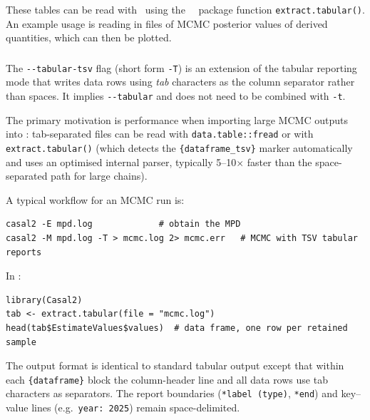 These tables can be read with \R\ using the \CNAME\ \R\ package function \texttt{extract.tabular()}. An example usage is reading in files of MCMC posterior values of derived quantities, which can then be plotted.

\subsubsection{}
\label{sec:TabularTSV}

The \texttt{-{}-tabular-tsv} flag (short form \texttt{-T}) is an extension of the tabular reporting mode that writes data rows using \emph{tab} characters as the column separator rather than spaces. It implies \texttt{-{}-tabular} and does not need to be combined with \texttt{-t}.

The primary motivation is performance when importing large MCMC outputs into \R: tab-separated files can be read with \texttt{data.table::fread} or with \texttt{extract.tabular()} (which detects the \texttt{\{dataframe\_tsv\}} marker automatically and uses an optimised internal parser, typically 5--10$\times$ faster than the space-separated path for large chains).

A typical workflow for an MCMC run is:
{\small{\begin{verbatim}
casal2 -E mpd.log             # obtain the MPD
casal2 -M mpd.log -T > mcmc.log 2> mcmc.err   # MCMC with TSV tabular reports
\end{verbatim}}}

In \R:
{\small{\begin{verbatim}
library(Casal2)
tab <- extract.tabular(file = "mcmc.log")
head(tab$EstimateValues$values)  # data frame, one row per retained sample
\end{verbatim}}}

The output format is identical to standard tabular output except that within each \texttt{\{dataframe\}} block the column-header line and all data rows use tab characters as separators. The report boundaries (\texttt{*label (type)}, \texttt{*end}) and key--value lines (e.g.~\texttt{year: 2025}) remain space-delimited.


